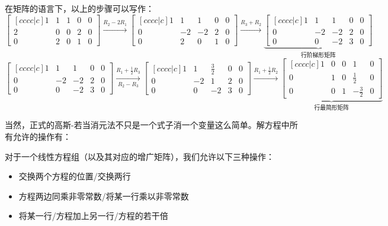 \documentclass{chem-art}
\begin{document}
在矩阵的语言下，以上的步骤可以写作：
\begin{equation}
    \begin{bmatrix}[cccc|c]
        1 & 1 & 1 & 0 & 0\\
        2 & 0 & 0 & 2 & 0\\
        0 & 2 & 0 & 1 & 0
    \end{bmatrix}
    \xrightarrow{R_{2} - 2R_{1}}
    \begin{bmatrix}[cccc|c]
        1 & 1 & 1 & 0 & 0\\
        0 & -2 & -2 & 2 & 0\\
        0 & 2 & 0 & 1 & 0
    \end{bmatrix}
    \xrightarrow{R_{3} + R_{2}}
    \underbrace{
        \begin{bmatrix}[cccc|c]
            1 & 1 & 1 & 0 & 0\\
            0 & -2 & -2 & 2 & 0\\
            0 & 0 & -2 & 3 & 0
        \end{bmatrix}
        \label{eq:row-echelon}
    }_{\text{行阶梯形矩阵}}
\end{equation}
\begin{equation}
    \begin{bmatrix}[cccc|c]
        1 & 1 & 1 & 0 & 0\\
        0 & -2 & -2 & 2 & 0\\
        0 & 0 & -2 & 3 & 0
    \end{bmatrix}
    \xrightarrow[R_{2} - R_{3}]{R_{1} + \frac{1}{2}R_{3}}
    \begin{bmatrix}[cccc|c]
        1 & 1 & \tfrac{3}{2} & 0 & 0\\
        0 & -2 & 1 & 2 & 0\\
        0 & 0 & -2 & 3 & 0
    \end{bmatrix}
    \xrightarrow{R_{1} + \frac{1}{2}R_{2}}
    \underbrace{
        \begin{bmatrix}[cccc|c]
            1 & 0 & 0 & 1 & 0\\
            0 & 1 & 0 & \tfrac{1}{2} & 0\\
            0 & 0 & 1 & -\tfrac{3}{2} & 0
        \end{bmatrix}
    \label{eq:reduced-row-echelon}}_{\text{行最简形矩阵}}
\end{equation}

当然，正式的高斯-若当消元法不只是一个式子消一个变量这么简单。解方程中所有允许的操作有：
\begin{definition}[初等行变换]
    对于一个线性方程组（以及其对应的增广矩阵），我们允许以下三种操作：
    \begin{itemize}
        \item 交换两个方程的位置/交换两行
        \item 方程两边同乘非零常数/将某一行乘以非零常数
        \item 将某一行/方程加上另一行/方程的若干倍
    \end{itemize}
\end{definition}
\end{document}
